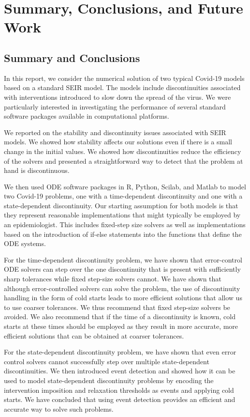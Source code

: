 \section{Summary, Conclusions, and Future Work}
\label{section:summary}
\subsection{Summary and Conclusions}
In this report, we consider the numerical solution of two typical Covid-19 models based on a standard SEIR model. The models include discontinuities associated with interventions introduced to slow down the spread of the virus. We were particularly interested in investigating the performance of several standard software packages available in computational platforms.

We reported on the stability and discontinuity issues associated with SEIR models. We showed how stability affects our solutions even if there is a small change in the initial values. We showed how discontinuities reduce the efficiency of the solvers and presented a straightforward way to detect that the problem at hand is discontinuous.

We then used ODE software packages in R, Python, Scilab, and Matlab to model two Covid-19 problems, one with a time-dependent discontinuity and one with a state-dependent discontinuity. Our starting assumption for both models is that they represent reasonable implementations that might typically be employed by an epidemiologist. This includes fixed-step size solvers as well as implementations based on the introduction of if-else statements into the functions that define the ODE systems. 

For the time-dependent discontinuity problem, we have shown that error-control ODE solvers can step over the one discontinuity that is present with sufficiently sharp tolerances while fixed step-size solvers cannot. We have shown that although error-controlled solvers can solve the problem, the use of discontinuity handling in the form of cold starts leads to more efficient solutions that allow us to use coarser tolerances. We thus recommend that fixed step-size solvers be avoided. We also recommend that if the time of a discontinuity is known, cold starts at these times should be employed as they result in more accurate, more efficient solutions that can be obtained at coarser tolerances.

For the state-dependent discontinuity problem, we have shown that even error control solvers cannot successfully step over multiple state-dependent discontinuities. We then introduced event detection and showed how it can be used to model state-dependent discontinuity problems by encoding the intervention imposition and relaxation thresholds as events and applying cold starts. We have concluded that using event detection provides an efficient and accurate way to solve such problems.


